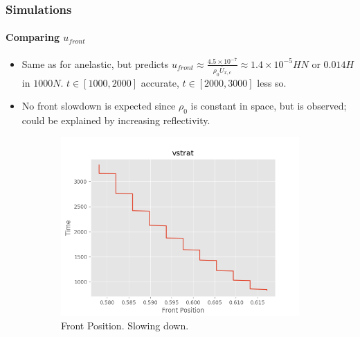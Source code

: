 \documentclass[dvipsnames, 10pt]{beamer}
\newcommand*{\scinot}[2]{#1\times10^{#2}}
\begin{document}
\begin{frame}
\begin{figure}[t]
\begin{subfigure}{0.55\textwidth}
        \end{subfigure}
        \hspace*{-19mm}%
    \end{figure}
\end{frame}

\begin{frame}
    \frametitle{Simulations}
    \framesubtitle{Comparing $u_{front}$}

    \begin{itemize}
        \item Same as for anelastic, but predicts
            $u_{front} \approx \frac{\scinot{4.5}{-7}}{\rho_0 \bar{U}_{x, c}}
            \approx \scinot{1.4}{-5}HN$ or $0.014H$ in $1000N$. $t \in [1000,
            2000]$ accurate, $t \in [2000, 3000]$ less so.

        \item No front slowdown is expected since $\rho_0$ is constant in space,
            but is observed; could be explained by increasing reflectivity.
    \end{itemize}
    \begin{figure}[t]
        \centering
        \hspace*{-19mm}%
        \begin{subfigure}{0.53\textwidth}
            \centering
            \includegraphics[width=\textwidth]{front_vstrat.png}
            \caption{Front Position. Slowing down.}
        \end{subfigure}
        \begin{subfigure}{0.53\textwidth}
            \centering

\end{subfigure}
\end{figure}
\end{frame}
\end{document}
